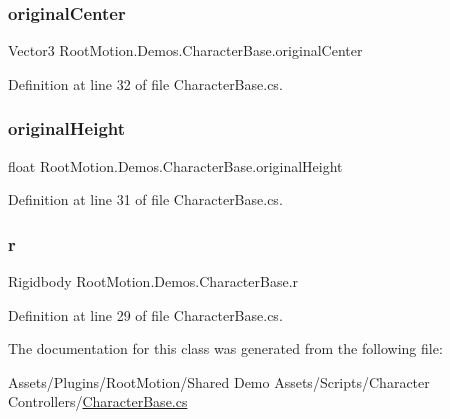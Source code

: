 \subsubsection{\texorpdfstring{original\+Center}{originalCenter}}
{\footnotesize\ttfamily Vector3 Root\+Motion.\+Demos.\+Character\+Base.\+original\+Center\hspace{0.3cm}{\ttfamily [protected]}}



Definition at line 32 of file Character\+Base.\+cs.

\mbox{\label{class_root_motion_1_1_demos_1_1_character_base_a42b4020a3dfb9f7054f95edc399fb16f}} 
\subsubsection{\texorpdfstring{original\+Height}{originalHeight}}
{\footnotesize\ttfamily float Root\+Motion.\+Demos.\+Character\+Base.\+original\+Height\hspace{0.3cm}{\ttfamily [protected]}}



Definition at line 31 of file Character\+Base.\+cs.

\mbox{\label{class_root_motion_1_1_demos_1_1_character_base_acbb46362a91c1781f64feb7c486bd173}} 
\subsubsection{\texorpdfstring{r}{r}}
{\footnotesize\ttfamily Rigidbody Root\+Motion.\+Demos.\+Character\+Base.\+r\hspace{0.3cm}{\ttfamily [protected]}}



Definition at line 29 of file Character\+Base.\+cs.



The documentation for this class was generated from the following file\+:\begin{DoxyCompactItemize}
\item 
Assets/\+Plugins/\+Root\+Motion/\+Shared Demo Assets/\+Scripts/\+Character Controllers/\mbox{\hyperlink{_character_base_8cs}{Character\+Base.\+cs}}\end{DoxyCompactItemize}

